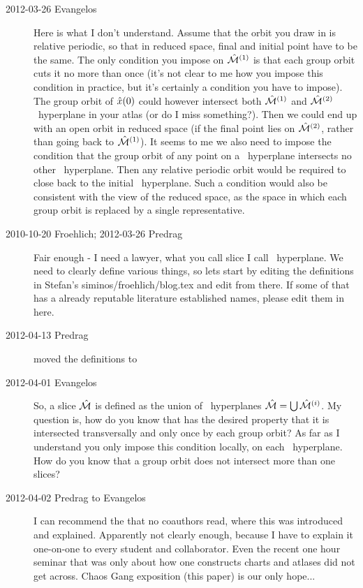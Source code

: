 \begin{description}
\item[2012-03-26 Evangelos] Here is what I don't understand. Assume that the
orbit you draw in  is relative periodic, so that in reduced
space, final and initial point have to be the same. The only
condition you impose on $\hat{\cal M}{}^{(1)}$ is that each group orbit cuts it no more
than once (it's not clear to me how you impose this condition in practice,
but it's certainly a condition you have to impose). The group orbit of
$\hat{x}(0)$ could however intersect both $\hat{\cal M}{}^{(1)}$  and $\hat{\cal M}{}^{(2)}$
\slice\ hyperplane in your atlas (or do I miss something?). Then we could end up with an
open orbit in reduced space (if the final point lies on $\hat{\cal M}{}^{(2)}$,
rather than going back to $\hat{\cal M}{}^{(1)}$). It seems to me we also need
to impose the condition that the group orbit of any point on a \slice\ hyperplane intersects
no other \slice\ hyperplane. Then any relative periodic orbit would be required to close back
to the initial \slice\ hyperplane. Such a condition would also be consistent
with the view of the reduced space, as the space in which each group orbit
is replaced by a single representative.

\item[2010-10-20 Froehlich; 2012-03-26 Predrag]
Fair enough - I need a lawyer, what you call slice I call \slice\
hyperplane. We need to clearly define various things, so lets start by
editing the definitions\rf{CartanMF,FelsOlver98,FelsOlver99,OlverInv} in
Stefan's siminos/froehlich/blog.tex and edit from there. If some of that
has a already reputable literature established names, please edit them in
here.

\item[2012-04-13 Predrag] moved the definitions to 


\item[2012-04-01 Evangelos] So, a slice $\hat{\cal M}$ is defined as the union
of \slice\ hyperplanes $\hat{\cal M}=\bigcup\hat{\cal M}{}^{(i)}$. My question is,
how do you know that \pSRed has the desired property that it is
intersected transversally and only once by each group orbit? As far as I
understand you only impose this condition locally, on each \slice\
hyperplane. How do you know that a group orbit does not intersect more
than one slices?

\item[2012-04-02 Predrag to Evangelos] I can recommend the
 that no coauthors read, where this was introduced and
explained. Apparently not clearly enough, because I have to explain it
one-on-one to every student and collaborator. Even the recent one hour
seminar that was only about how one constructs charts and atlases did not
get across. Chaos Gang exposition (this paper) is our only hope...



\end{description}
